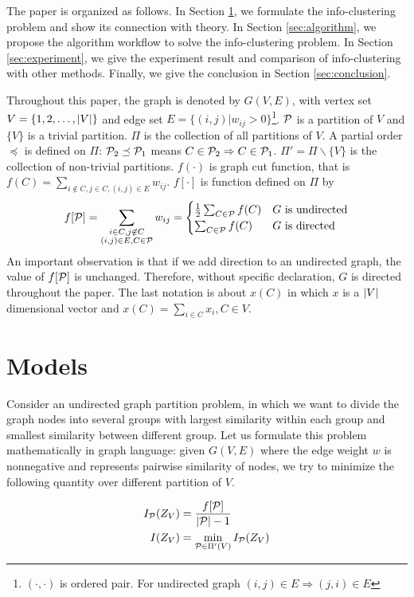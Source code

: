 \documentclass{article}
\begin{document}
The paper is organized as follows. In Section \ref{sec:models}, we formulate the info-clustering problem and show its connection with theory. In Section \ref{sec:algorithm}, we propose the algorithm workflow to solve the info-clustering problem. In Section \ref{sec:experiment}, we give the experiment result and comparison of info-clustering with other methods. Finally, we give the conclusion in Section \ref{sec:conclusion}.

Throughout this paper, the graph is denoted by $G(V,E)$, with vertex set $V = \{1, 2, \dots, \abs{V}\}$ and edge set $E=\{(i,j) | w_{ij}>0\}$\footnote{$(\cdot, \cdot)$ is ordered pair. For undirected graph $(i,j) \in E \Rightarrow (j,i) \in E$}. $\P$ is a partition of $V$ and $\{V\}$ is a trivial partition. $\Pi$ is the collection of all partitions of $V$. A partial order $\preceq $ is defined on $\Pi$: $\P_2 \preceq \P_1$ means $C\in \P_2 \Rightarrow C \in \P_1$. $\Pi' = \Pi \backslash \{V\}$ is the collection of non-trivial partitions. $f(\cdot)$ is graph cut function, that is $f(C) = \sum_{i\not\in C, j\in C, (i,j) \in E} w_{ij}$. $f[\cdot]$ is function defined on $\Pi$ by
\begin{equation}
f[\P] = \sum_{\substack{i\in C, j \not\in C\\ (i,j)\in E, C\in \mathcal{P}}} w_{ij} =
\begin{cases}
\frac{1}{2} \sum_{C\in \P}f(C)   & G \textrm{ is undirected} \\
\sum_{C\in \P}f(C)   & G \textrm{ is directed}
\end{cases}
\end{equation}
An important observation is that if we add direction to an undirected graph, the value of $f[\P]$ is unchanged. Therefore, without specific declaration, $G$ is directed throughout the paper. The last notation is about $x(C)$ in which $x$ is a $\abs{V}$ dimensional vector and $x(C)=\sum_{i \in C} x_i, C\in V$.
\section{Models}\label{sec:models}

Consider an undirected graph partition problem, in which we want to divide the graph nodes into several groups with largest similarity within each group and smallest similarity between different group. Let us formulate this problem mathematically in graph language: given $G(V, E)$ where the edge weight $w$ is nonnegative and represents pairwise similarity of nodes, we try to minimize the following quantity over different partition of $V$.
\begin{definition}\label{def:ms}
\begin{align}
I_{\P}(Z_V) & = \frac{ f[\P] }{  \abs{\mathcal{P}} - 1 }\\
I(Z_V) & = \min_{\mathcal{P} \in \Pi'(V)} I_{\mathcal{P}}(Z_V)  \label{eq:ms}
\end{align}
\end{definition}
\end{document}
